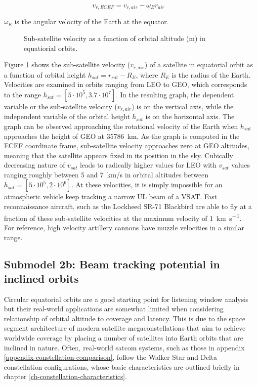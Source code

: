 \documentclass[english, 12pt, a4paper, elec, utf8, a-1b, online]{aaltothesis}
\begin{document}
\begin{equation}
  v_{r, ECEF} = v_{r, air} - \omega_E r_{air}
\end{equation}

\noindent
$\omega_E$ is the angular velocity of the Earth at the equator.

\begin{figure}[h]
  \centering
  
  \caption{Sub-satellite velocity as a function of orbital altitude (m) in equatiorial orbits.}
  \label{fig-subsat-velocity-equatiorial}
\end{figure}

Figure \ref{fig-subsat-velocity-equatiorial} shows the sub-satellite velocity ($v_{r, air}$) of a satellite in equatorial orbit as a function of orbital height $h_{sat} = r_{sat} - R_{E}$, where $R_{E}$ is the radius of the Earth.
Velocities are examined in orbits ranging from LEO to GEO, which corresponds to the range $h_{sat} = [5 \cdot 10^5, 3.7 \cdot 10^7]$.
In the resulting graph, the dependent variable or the sub-satellite velocity ($v_{r, air}$) is on the vertical axis, while the independent variable of the orbital height $h_{sat}$ is on the horizontal axis.
The graph can be observed approaching the rotational velocity of the Earth when $h_{sat}$ approaches the height of GEO at \SI{35786}{\kilo\meter}.
As the graph is computed in the ECEF coordinate frame, sub-satellite velocity approaches zero at GEO altitudes, meaning that the satellite appears fixed in its position in the sky.
Cubically decreasing nature of $v_{sat}$ leads to radically higher values for LEO with $v_{sat}$ values ranging roughly between 5 and 7\ km/s in orbital altitudes between $h_{sat} = [5 \cdot 10^5, 2 \cdot 10^6]$.
At these velocities, it is simply impossible for an atmospheric vehicle keep tracking a narrow UL beam of a VSAT.
Fast reconnaissance aircraft, such as the Lockheed SR-71 Blackbird are able to fly at a fraction of these sub-satellite velocities at the maximum velocity of \SI{1}{\kilo\meter\per\second}.
For reference, high velocity artillery cannons have muzzle velocities in a similar range.

\subsection{Submodel 2b: Beam tracking potential in inclined orbits} \label{ch-results-submodel-2b-tracking-inclined}

Circular equatorial orbits are a good starting point for listening window analysis but their real-world applications are somewhat limited when considering relationship of orbital altitude to coverage and latency.
This is due to the space segment architecture of modern satellite megaconstellations that aim to achieve worldwide coverage by placing a number of satellites into Earth orbits that are inclined in nature.
Often, real-world satcom systems, such as those in appendix \ref{appendix-constellation-comparison}, follow the Walker Star and Delta constellation configurations, whose basic characteristics are outlined briefly in chapter \ref{ch-constellation-characteristics}.
\end{document}
